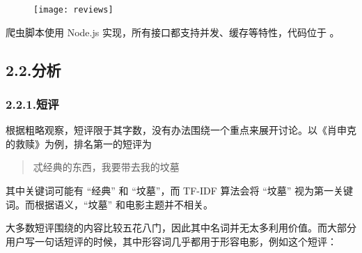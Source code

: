 \documentclass[10pt]{article}
\begin{document}
\begin{figure}[tbp]%
\begin{mdcenter}%

\noindent{}\texttt{[image: reviews]}{}%

\mdhr{}%

\noindent{}%
\end{mdcenter}\label{fig-reviews}%
\end{figure}%

\noindent{}爬虫脚本使用 Node.js 实现，所有接口都支持并发、缓存等特性，代码位于 。%

\subsection{2.2.\hspace*{0.5em}分析}\label{section}%

\subsubsection{2.2.1.\hspace*{0.5em}短评}\label{section}%

\noindent{}根据粗略观察，短评限于其字数，没有办法围绕一个重点来展开讨论。以《肖申克的救赎》为例，排名第一的短评为%

\begin{quote}%

\noindent{}忒经典的东西，我要带去我的坟墓%
\end{quote}%

\noindent{}其中关键词可能有 \textquotedblleft{}经典\textquotedblright{} 和 \textquotedblleft{}坟墓\textquotedblright{}，而 TF-IDF 算法会将 \textquotedblleft{}坟墓\textquotedblright{} 视为第一关键词。而根据语义，\textquotedblleft{}坟墓\textquotedblright{} 和电影主题并不相关。%

大多数短评围绕的内容比较五花八门，因此其中名词并无太多利用价值。而大部分用户写一句话短评的时候，其中形容词几乎都用于形容电影，例如这个短评：%
\end{document}
